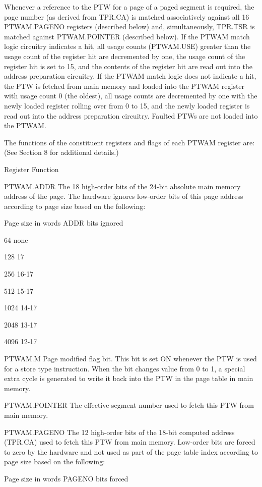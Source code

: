 Whenever a reference to the PTW for a page of a paged segment is required, the
page number (as derived from TPR.CA) is matched associatively against all 16
PTWAM.PAGENO registers (described below) and, simultaneously, TPR.TSR is
matched against PTWAM.POINTER (described below). If the PTWAM match logic
circuitry indicates a hit, all usage counts (PTWAM.USE) greater than the usage
count of the register hit are decremented by one, the usage count of the
register hit is set to 15, and the contents of the register hit are read out
into the address preparation circuitry. If the PTWAM match logic does not
indicate a hit, the PTW is fetched from main memory and loaded into the PTWAM
register with usage count 0 (the oldest), all usage counts are decremented by
one with the newly loaded register rolling over from 0 to 15, and the newly
loaded register is read out into the address preparation circuitry. Faulted
PTWs are not loaded into the PTWAM.  

The functions of the constituent registers and flags of each PTWAM register
are: (See Section 8 for additional details.)

Register Function

PTWAM.ADDR The 18 high-order bits of the 24-bit absolute main memory address of
the page. The hardware ignores low-order bits of this page address according to
page size based on the following:

Page size in words ADDR bits ignored

64 none

128 17

256 16-17

512 15-17

1024 14-17

2048 13-17

4096 12-17

PTWAM.M Page modified flag bit. This bit is set ON whenever the PTW is used for
a store type instruction. When the bit changes value from 0 to 1, a special
extra cycle is generated to write it back into the PTW in the page table in
main memory.

PTWAM.POINTER The effective segment number used to fetch this PTW from main
memory.

PTWAM.PAGENO The 12 high-order bits of the 18-bit computed address (TPR.CA)
used to fetch this PTW from main memory. Low-order bits are forced to zero by
the hardware and not used as part of the page table index according to page
size based on the following:

Page size in words PAGENO bits forced

